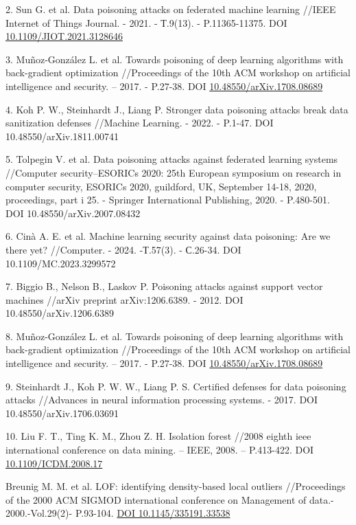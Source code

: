 2. Sun G. et al. Data poisoning attacks on federated machine learning
//IEEE Internet of Things Journal. - 2021. - Т.9(13). - P.11365-11375.
DOI
\href{http://dx.doi.org/10.1109/JIOT.2021.3128646}{10.1109/JIOT.2021.3128646}

3. Muñoz-González L. et al. Towards poisoning of deep learning algorithms
with back-gradient optimization //Proceedings of the 10th ACM workshop
on artificial intelligence and security. -- 2017. - P.27-38. DOI
\href{http://dx.doi.org/10.48550/arXiv.1708.08689}{10.48550/arXiv.1708.08689}

4. Koh P. W., Steinhardt J., Liang P. Stronger data poisoning attacks
break data sanitization defenses //Machine Learning. - 2022. - P.1-47.
DOI 10.48550/arXiv.1811.00741

5. Tolpegin V. et al. Data poisoning attacks against federated learning
systems //Computer security--ESORICs 2020: 25th European symposium on
research in computer security, ESORICs 2020, guildford, UK, September
14-18, 2020, proceedings, part i 25. - Springer International
Publishing, 2020. - P.480-501. DOI 10.48550/arXiv.2007.08432

6. Cinà A. E. et al. Machine learning security against data poisoning:
Are we there yet? //Computer. - 2024. -Т.57(3). - С.26-34. DOI
10.1109/MC.2023.3299572

7. Biggio B., Nelson B., Laskov P. Poisoning attacks against support
vector machines //arXiv preprint arXiv:1206.6389. - 2012. DOI
10.48550/arXiv.1206.6389

8. Muñoz-González L. et al. Towards poisoning of deep learning algorithms
with back-gradient optimization //Proceedings of the 10th ACM workshop
on artificial intelligence and security. -- 2017. - P.27-38. DOI
\href{http://dx.doi.org/10.48550/arXiv.1708.08689}{10.48550/arXiv.1708.08689}

9. Steinhardt J., Koh P. W. W., Liang P. S. Certified defenses for data
poisoning attacks //Advances in neural information processing systems. -
2017. DOI 10.48550/arXiv.1706.03691

10. Liu F. T., Ting K. M., Zhou Z. H. Isolation forest //2008 eighth ieee
international conference on data mining. -- IEEE, 2008. -- P.413-422.
DOI \href{http://dx.doi.org/10.1109/ICDM.2008.17}{10.1109/ICDM.2008.17}

Breunig M. M. et al. LOF: identifying density-based local outliers
//Proceedings of the 2000 ACM SIGMOD international conference on
Management of data.- 2000.-Vol.29(2)- P.93-104.
\href{https://doi.org/10.1145/335191.335388}{DOI 10.1145/335191.33538}

